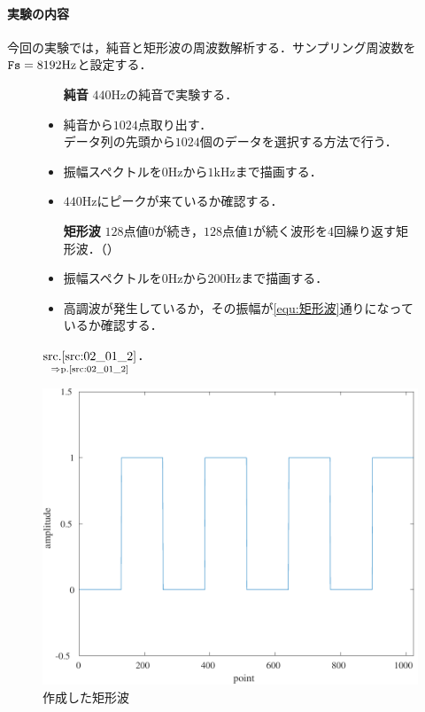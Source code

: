 \paragraph{実験の内容}今回の実験では，純音と矩形波の周波数解析する．サンプリング周波数を\(\textrm{\texttt{Fs}}=8192\textrm{Hz}\)と設定する．
\begin{figure}[H]
    \begin{minipage}[c]{.55\textwidth}
        \begin{itemize}
            \item[\textbf{純音}] \(440\textrm{Hz}\)の純音で実験する．
            \item 純音から\(1024\)点取り出す．\\
                  データ列の先頭から\(1024\)個のデータを選択する方法で行う．
            \item 振幅スペクトルを\(0\textrm{Hz}\)から\(1\textrm{kHz}\)まで描画する．
            \item \(440\textrm{Hz}\)にピークが来ているか確認する．
            \item[\textbf{矩形波}] \(128\)点値\(0\)が続き，\(128\)点値\(1\)が続く波形を\(4\)回繰り返す矩形波．（）
            \item 振幅スペクトルを\(0\textrm{Hz}\)から\(200\textrm{Hz}\)まで描画する．
            \item 高調波が発生しているか，その振幅が\eqref{equ:矩形波}通りになっているか確認する．
        \end{itemize}
        \(\underset{\Rightarrow\textrm{p.\pageref{src:02_01_2}}}{\textrm{\srcref{src:02_01_2}}}\)．
    \end{minipage}
    \begin{minipage}[c]{.4\textwidth}
        \centering
        \includegraphics[keepaspectratio,width=\textwidth]{../../Figures/02_021.pdf}
        \caption{作成した矩形波}
        \label{fig:作成した矩形波}
    \end{minipage}
\end{figure}
